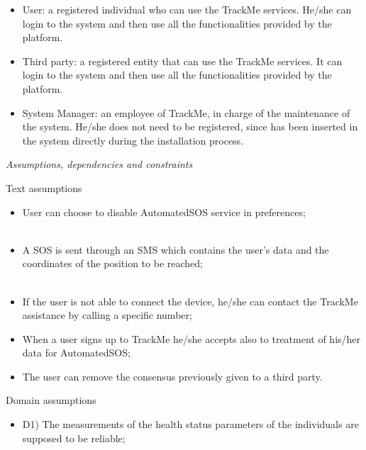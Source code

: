 \documentclass{article}
\begin{document}
\begin{legal}
\begin{legal}
{			\begin{itemize}
			 \item User: a registered individual who can use the TrackMe services. He/she can login to the system and then use all the functionalities provided by the platform.\\
			\item Third party: a registered entity that can use the TrackMe services. It can login to the system and then use all the functionalities provided by the platform.\\
 			\item System Manager:  an employee of TrackMe, in charge of the maintenance of the system. He/she does not need to be registered, since has been inserted in the system directly during the installation process.\\
			\end{itemize}
			}
		\item \textit{Assumptions, dependencies and constraints}
			\begin{legal}
    			\item Text assumptions\\
    			{\normalfont
				\begin{itemize}
					\item User can choose to disable AutomatedSOS service in preferences;\\\
					\item A SOS is sent through an SMS which contains the user's data and the coordinates of the position to be reached;\\\
					\item If the user is not able to connect the device, he/she can contact the TrackMe assistance by calling a specific number;\\
					\item When a user signs up to TrackMe he/she accepts also to treatment of his/her data for AutomatedSOS;\\
					\item The user can remove the consensus previously given to a third party.\\
				\end{itemize}}
			\newpage
			\item Domain assumptions \\
			{\normalfont
				\begin{itemize}
				\item D1) The measurements of the health status parameters of the individuals are supposed to be reliable;\\

\end{itemize}}
\end{legal}
\end{legal}
\end{legal}
\end{document}
